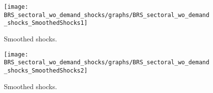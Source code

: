  
\begin{figure}[H]
\centering 
\texttt{[image: BRS\_sectoral\_wo\_demand\_shocks/graphs/BRS\_sectoral\_wo\_demand\_shocks\_SmoothedShocks1]}
\caption{Smoothed shocks.}\label{Fig:SmoothedShocks:1}
\end{figure}

\begin{figure}[H]
\centering 
\texttt{[image: BRS\_sectoral\_wo\_demand\_shocks/graphs/BRS\_sectoral\_wo\_demand\_shocks\_SmoothedShocks2]}
\caption{Smoothed shocks.}\label{Fig:SmoothedShocks:2}
\end{figure}


